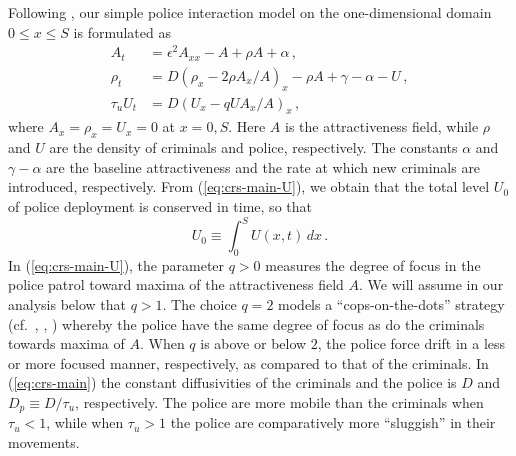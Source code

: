 \documentclass{article}%
\newcommand{\bsub}{\begin{subequations}}
\newcommand{\esub}{\end{subequations}$\!$}
\begin{document}
Following \cite{rick}, our simple police interaction model on the
one-dimensional domain $0\leq x \leq S$ is formulated as
\bsub\label{eq:crs-main}
\begin{alignat}{1}
A_{t} & =\epsilon^{2}A_{xx}-A+\rho A+\alpha\,, \label{eq:crs-main-A}\\
\rho_{t} & =D\left(\rho_{x}-2\rho A_{x}/A\right)_{x}-\rho A +\gamma-\alpha-
U\,, \label{eq:crs-main-rho}\\
\tau_{u}U_{t} & =D\left(U_{x}-qUA_{x}/A\right)_{x}\,,  \label{eq:crs-main-U}
\end{alignat}
\esub where $A_x=\rho_x=U_x=0$ at $x=0,S$. Here $A$ is the
attractiveness field, while $\rho$ and $U$ are the density of
criminals and police, respectively.  The constants $\alpha$ and
$\gamma-\alpha$ are the baseline attractiveness and the rate at which
new criminals are introduced, respectively. From
(\ref{eq:crs-main-U}), we obtain that the total level $U_0$ of police
deployment is conserved in time, so that
\begin{equation}\label{ss:pol_con}
   U_0 \equiv \int_{0}^{S} U(x,t)\, dx \,.
\end{equation}
In (\ref{eq:crs-main-U}), the parameter $q>0$ measures the degree of
focus in the police patrol toward maxima of the attractiveness field
$A$.  We will assume in our analysis below that $q>1$.  The choice
$q=2$ models a ``cops-on-the-dots'' strategy (cf.~\cite{jbc},
\cite{rick}, \cite{zipkin}) whereby the police have the same degree of
focus as do the criminals towards maxima of $A$. When $q$ is above or
below $2$, the police force drift in a less or more focused manner,
respectively, as compared to that of the criminals. In
(\ref{eq:crs-main}) the constant diffusivities of the criminals and
the police is $D$ and $D_p\equiv {D/\tau_{u}}$, respectively.  The
police are more mobile than the criminals when $\tau_u<1$, while when
$\tau_{u}>1$ the police are comparatively more ``sluggish'' in their
movements.
\end{document}
